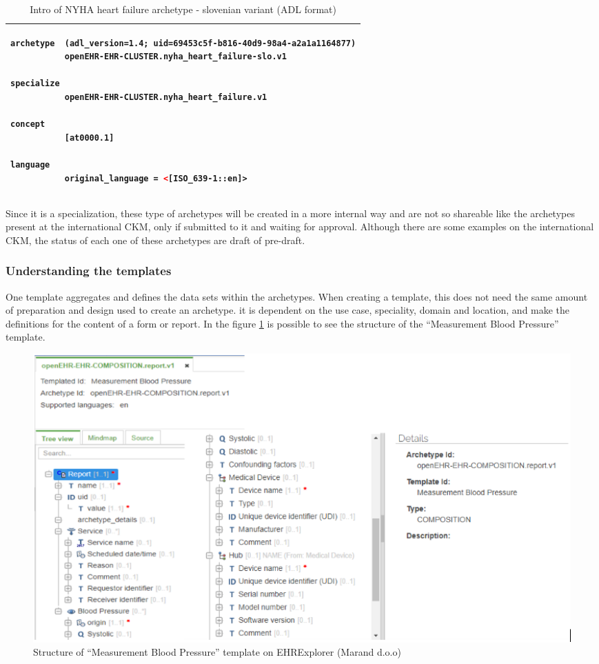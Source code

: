 \documentclass[mim_thesis.tex]{subfiles}
\begin{document}
\begin{table}[H]
	\centering
\caption{Intro of NYHA heart failure archetype - slovenian variant (ADL format)}
\label{tab:nyha_adl}
\begin{tabular}{l}
\toprule[2pt]
\begin{lstlisting}[language=XML]
archetype  (adl_version=1.4; uid=69453c5f-b816-40d9-98a4-a2a1a1164877)
           openEHR-EHR-CLUSTER.nyha_heart_failure-slo.v1

specialize
           openEHR-EHR-CLUSTER.nyha_heart_failure.v1

concept
           [at0000.1]
          
language
           original_language = <[ISO_639-1::en]>
\end{lstlisting}
\tabularnewline \bottomrule[2pt]
\end{tabular}
\end{table}

Since it is a specialization, these type of archetypes will be created in a more internal way and are not so shareable like the archetypes present at the international CKM, only if submitted to it and waiting for approval. Although there are some examples on the international CKM, the status of each one of these archetypes are draft of pre-draft.


\subsubsection{Understanding the templates}
One template aggregates and defines the data sets within the archetypes. When creating a template, this does not need the same amount of preparation and design used to create an archetype. it is dependent on the use case, speciality, domain and location, and make the definitions for the content of a form or report. In the figure \ref{fig:bp_arch_struct} is possible to see the structure of the “Measurement Blood Pressure” template.

\begin{figure}[H]
	\centering
    \includegraphics[width=1\textwidth]{img/bp_arch_struct.PNG}
	\caption{Structure of “Measurement Blood Pressure” template on EHRExplorer (Marand d.o.o) }
	\label{fig:bp_arch_struct}
\end{figure}
\end{document}
